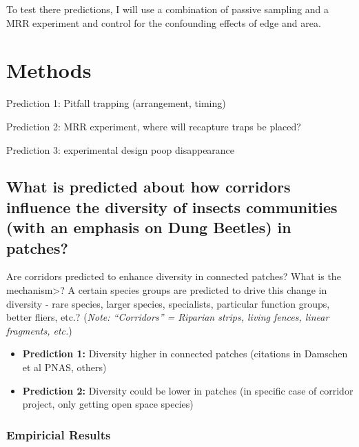 \documentclass[
  12pt,
]{article}
\begin{document}
To test there predictions, I will use a combination of passive sampling
and a MRR experiment and control for the confounding effects of edge and
area.

\hypertarget{methods}{%
\section{Methods}\label{methods}}

Prediction 1: Pitfall trapping (arrangement, timing)

Prediction 2: MRR experiment, where will recapture traps be placed?

Prediction 3: experimental design poop disappearance

\newpage

\hypertarget{what-is-predicted-about-how-corridors-influence-the-diversity-of-insects-communities-with-an-emphasis-on-dung-beetles-in-patches}{%
\subsection{What is predicted about how corridors influence the
diversity of insects communities (with an emphasis on Dung Beetles) in
patches?}\label{what-is-predicted-about-how-corridors-influence-the-diversity-of-insects-communities-with-an-emphasis-on-dung-beetles-in-patches}}

Are corridors predicted to enhance diversity in connected patches? What
is the mechanism\textgreater? A certain species groups are predicted to
drive this change in diversity - rare species, larger species,
specialists, particular function groups, better fliers, etc.?
(\emph{Note: ``Corridors'' = Riparian strips, living fences, linear
fragments, etc.})

\begin{itemize}
\item
  \textbf{Prediction 1:} Diversity higher in connected patches
  (citations in Damschen et al PNAS, others)
\item
  \textbf{Prediction 2:} Diversity could be lower in patches (in
  specific case of corridor project, only getting open space species)
\end{itemize}

\hypertarget{empiricial-results}{%
\subsubsection{Empiricial Results}\label{empiricial-results}}
\end{document}

